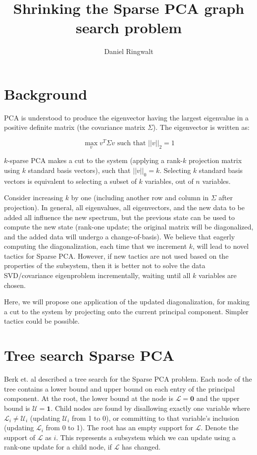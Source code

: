 \documentclass{article}
\title{Shrinking the Sparse PCA graph search problem}
\author{Daniel Ringwalt}
\begin{document}
	
\maketitle

\section{Background}

PCA is understood to produce the eigenvector having the largest eigenvalue in a positive definite matrix (the covariance matrix $\Sigma$). The eigenvector is written as:

$$\max_v v^T \Sigma v \text{ such that } ||v||_2 = 1$$

$k$-sparse PCA makes a cut to the system (applying a rank-$k$ projection matrix using $k$ standard basis vectors), such that $||v||_0 = k$. Selecting $k$ standard basis vectors is equivalent to selecting a subset of $k$ variables, out of $n$ variables.

Consider increasing $k$ by one (including another row and column in $\Sigma$ after projection). In general, all eigenvalues, all eigenvectors, and the new data to be added all influence the new spectrum, but the previous state can be used to compute the new state (rank-one update; the original matrix will be diagonalized, and the added data will undergo a change-of-basis). We believe that eagerly computing the diagonalization, each time that we increment $k$, will lead to novel tactics for Sparse PCA. However, if new tactics are not used based on the properties of the subsystem, then it is better not to solve the data SVD/covariance eigenproblem incrementally, waiting until all $k$ variables are chosen.

Here, we will propose one application of the updated diagonalization, for making a cut to the system by projecting onto the current principal component. Simpler tactics could be possible.

\section{Tree search Sparse PCA}

Berk et. al described a tree search for the Sparse PCA problem. Each node of the tree contains a lower bound and upper bound on each entry of the principal component. At the root, the lower bound at the node is $\mathcal{L} = \mathbf{0}$ and the upper bound is $\mathcal{U} = \mathbf{1}$. Child nodes are found by disallowing exactly one variable where $\mathcal{L}_i \not= \mathcal{U}_i$ (updating $\mathcal{U}_i$ from 1 to 0), or committing to that variable's inclusion (updating $\mathcal{L}_i$ from 0 to 1). The root has an empty support for $\mathcal{L}$. Denote the support of $\mathcal{L}$ as $i$. This represents a subsystem which we can update using a rank-one update for a child node, if $\mathcal{L}$ has changed.
\end{document}
